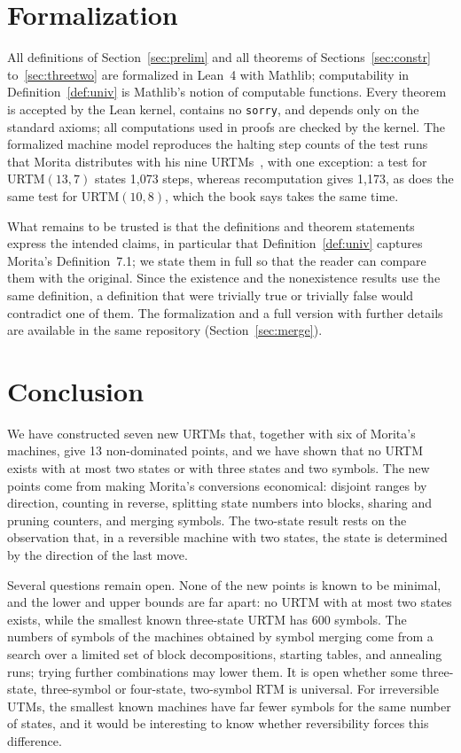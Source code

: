 \documentclass{article}
\theoremstyle{definition}
\theoremstyle{remark}
\begin{document}
\section{Formalization}
\label{sec:formal}

All definitions of Section~\ref{sec:prelim} and all theorems of Sections~\ref{sec:constr} to~\ref{sec:threetwo} are formalized in Lean~4 with Mathlib; computability in Definition~\ref{def:univ} is Mathlib's notion of computable functions.
Every theorem is accepted by the Lean kernel, contains no \texttt{sorry}, and depends only on the standard axioms; all computations used in proofs are checked by the kernel.
The formalized machine model reproduces the halting step counts of the test runs that Morita distributes with his nine URTMs~\cite{MoritaFiles}, with one exception: a test for URTM$(13,7)$ states 1,073 steps, whereas recomputation gives 1,173, as does the same test for URTM$(10,8)$, which the book says takes the same time.

What remains to be trusted is that the definitions and theorem statements express the intended claims, in particular that Definition~\ref{def:univ} captures Morita's Definition~7.1; we state them in full so that the reader can compare them with the original.
Since the existence and the nonexistence results use the same definition, a definition that were trivially true or trivially false would contradict one of them.
The formalization and a full version with further details are available in the same repository (Section~\ref{sec:merge}).

\section{Conclusion}

We have constructed seven new URTMs that, together with six of Morita's machines, give 13 non-dominated points, and we have shown that no URTM exists with at most two states or with three states and two symbols.
The new points come from making Morita's conversions economical: disjoint ranges by direction, counting in reverse, splitting state numbers into blocks, sharing and pruning counters, and merging symbols.
The two-state result rests on the observation that, in a reversible machine with two states, the state is determined by the direction of the last move.

Several questions remain open.
None of the new points is known to be minimal, and the lower and upper bounds are far apart: no URTM with at most two states exists, while the smallest known three-state URTM has 600 symbols.
The numbers of symbols of the machines obtained by symbol merging come from a search over a limited set of block decompositions, starting tables, and annealing runs; trying further combinations may lower them.
It is open whether some three-state, three-symbol or four-state, two-symbol RTM is universal.
For irreversible UTMs, the smallest known machines have far fewer symbols for the same number of states, and it would be interesting to know whether reversibility forces this difference.
\end{document}
